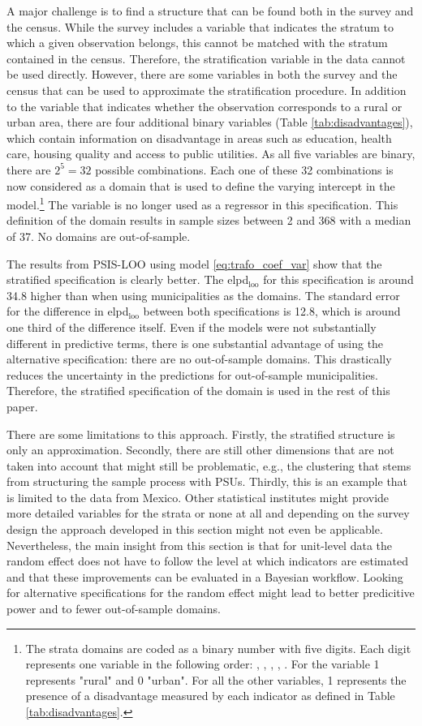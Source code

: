 A major challenge is to find a structure that can be found both in the survey and the census.
While the survey includes a variable that indicates the stratum to which a given observation belongs, this cannot be matched with the stratum contained in the census.
Therefore, the stratification variable in the data cannot be used directly.
However, there are some variables in both the survey and the census that can be used to approximate the stratification procedure.
In addition to the  variable that indicates whether the observation corresponds to a rural or urban area, there are four additional binary variables (Table \ref{tab:disadvantages}), which contain information on disadvantage in areas such as education, health care, housing quality and access to public utilities.
As all five variables are binary, there are $2^5 = 32$ possible combinations.
Each one of these 32 combinations is now considered as a domain that is used to define the varying intercept in the model.\footnote{The strata domains are coded as a binary number with five digits. Each digit represents one variable in the following order: , , , , . For the  variable 1 represents "rural" and 0 "urban". For all the other variables, 1 represents the presence of a disadvantage measured by each indicator as defined in Table \ref{tab:disadvantages}.}
The variable  is no longer used as a regressor in this specification.
This definition of the domain results in sample sizes between 2 and 368 with a median of 37.
No domains are out-of-sample.

The results from PSIS-LOO using model \ref{eq:trafo_coef_var} show that the stratified specification is clearly better. The elpd$_{\text{loo}}$ for this specification is around 34.8 higher than when using  municipalities as the domains.
The standard error for the difference in elpd$_{\text{loo}}$ between both specifications is 12.8, which is around one third of the difference itself.
Even if the models were not substantially different in predictive terms, there is one substantial advantage of using the alternative specification: there are no out-of-sample domains.
This drastically reduces the uncertainty in the predictions for out-of-sample municipalities.
Therefore, the stratified specification of the domain is used in the rest of this paper.

There are some limitations to this approach.
Firstly, the stratified structure is only an approximation.
Secondly, there are still other dimensions that are not taken into account that might still be problematic, e.g., the clustering that stems from structuring the sample process with PSUs.
Thirdly, this is an example that is limited to the data from Mexico.
Other statistical institutes might provide more detailed variables for the strata or none at all and depending on the survey design the approach developed in this section might not even be applicable.
Nevertheless, the main insight from this section is that for unit-level data the random effect does not have to follow the level at which indicators are estimated and that these improvements can be evaluated in a Bayesian workflow.
Looking for alternative specifications for the random effect might lead to better predicitive power and to fewer out-of-sample domains.